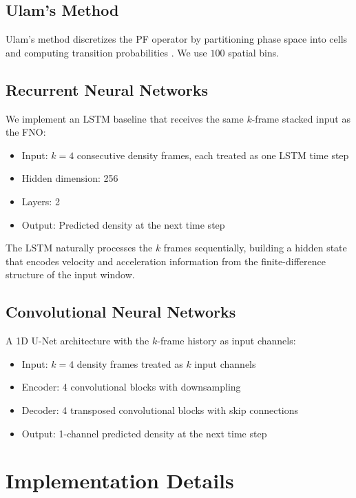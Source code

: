 \documentclass[11pt]{article}
\begin{document}
\subsection{Ulam's Method}

Ulam's method discretizes the PF operator by partitioning phase space into cells and computing transition probabilities \cite{ulam1960collection}. We use $100$ spatial bins.

\subsection{Recurrent Neural Networks}

We implement an LSTM baseline that receives the same $k$-frame stacked input as the FNO:
\begin{itemize}
    \item Input: $k=4$ consecutive density frames, each treated as one LSTM time step
    \item Hidden dimension: 256
    \item Layers: 2
    \item Output: Predicted density at the next time step
\end{itemize}
The LSTM naturally processes the $k$ frames sequentially, building a hidden state that encodes velocity and acceleration information from the finite-difference structure of the input window.

\subsection{Convolutional Neural Networks}

A 1D U-Net architecture with the $k$-frame history as input channels:
\begin{itemize}
    \item Input: $k=4$ density frames treated as $k$ input channels
    \item Encoder: 4 convolutional blocks with downsampling
    \item Decoder: 4 transposed convolutional blocks with skip connections
    \item Output: 1-channel predicted density at the next time step
\end{itemize}

\section{Implementation Details}
\end{document}
